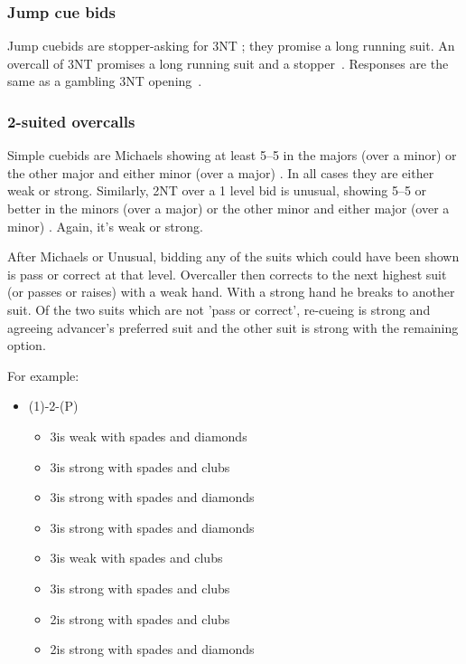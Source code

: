 \documentclass[a4paper,14pt]{extarticle}
\begin{document}
\subsubsection{Jump cue bids}
Jump cuebids are stopper-asking for 3NT ; they promise a long
running suit.  An overcall of 3NT promises a long running suit and a stopper~.
Responses are the same as a gambling 3NT opening~.

\subsubsection{2-suited overcalls}

Simple cuebids are Michaels showing at least 5--5 in the majors (over a minor)
or the other major and either minor (over a major) . In all cases they are
either weak or strong. Similarly, 2NT over a 1 level bid is unusual, showing
5--5 or better in the minors (over a major) or the other minor and either major
(over a minor) . Again, it's weak or strong.

After Michaels or Unusual, bidding any of the suits which could have been shown
is pass or correct at that level. Overcaller then corrects to the next highest
suit (or passes or raises) with a weak hand. With a strong hand he breaks to
another suit. Of the two suits which are not 'pass or correct', re-cueing is
strong and agreeing advancer's preferred suit and the other suit is strong with
the remaining option.

For example:
\begin{itemize}
\item (1\hearts)-2\hearts-(P)
	\begin{itemize}
	\item 3\diamonds is weak with spades and diamonds
	\item 3\hearts is strong with spades and clubs
	\item 3\spades is strong with spades and diamonds
	\item 3\hearts is strong with spades and diamonds
	\item 3\spades is weak with spades and clubs
	\item 3\clubs is strong with spades and clubs
	\item 2\clubs is strong with spades and clubs
	\item 2\diamonds is strong with spades and diamonds
	\end{itemize}
\end{itemize}
\end{document}
